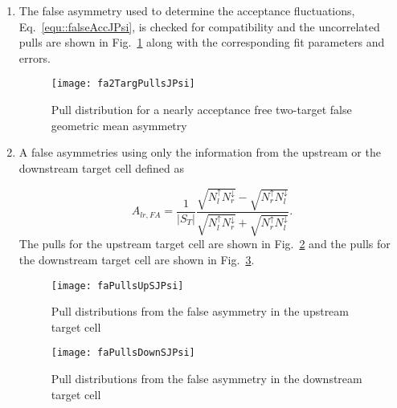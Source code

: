 \begin{enumerate}
  \label{tab::additionalFAJPsi}

\item The false asymmetry used to determine the acceptance fluctuations,
  Eq.~\ref{equ::falseAccJPsi}, is checked for compatibility and the
  uncorrelated pulls are shown in Fig.~\ref{fig::fa2TargPullsJPsi} along with
  the corresponding fit parameters and errors.

  \begin{figure}[h!t]
    \centering \texttt{[image: fa2TargPullsJPsi]}
    \caption{Pull distribution for a nearly acceptance free two-target false
      geometric mean asymmetry}
    \label{fig::fa2TargPullsJPsi}
  \end{figure}

  \item A false asymmetries using only the information from the upstream or the
  downstream target cell defined as

  \begin{equation}
    \label{equ::falseANgeomeanJPsi}
    A_{lr, FA} =
    \frac{1}{|S_T|}
    \frac{\sqrt{N_l^\uparrow N_r^\downarrow}
      - \sqrt{N_r^\uparrow N_l^\downarrow}
    }{
      \sqrt{N_l^\uparrow N_r^\downarrow}
      + \sqrt{N_r^\uparrow N_l^\downarrow}
    }.
  \end{equation}
  The pulls for the upstream target cell are shown in
  Fig.~\ref{fig::faPullsUpSJPsi} and the pulls for the downstream target cell
  are shown in Fig.~\ref{fig::faPullsDownSJPsi}.

  \begin{figure}[h!t]
  \centering \texttt{[image: faPullsUpSJPsi]}
  \caption{Pull distributions from the false asymmetry in the upstream target
    cell}
  \label{fig::faPullsUpSJPsi}
  \end{figure}

\begin{figure}[h!t]
  \centering \texttt{[image: faPullsDownSJPsi]}
  \caption{Pull distributions from the false asymmetry in the downstream target
    cell}
  \label{fig::faPullsDownSJPsi}
\end{figure}

\end{enumerate}

